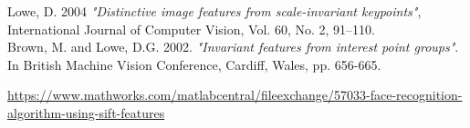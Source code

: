 \documentclass[conference]{IEEEtran}
\begin{document}
\medskip
\begin{thebibliography}{9}

{Lowe, D. 2004 \textit{"Distinctive image features from scale-invariant keypoints"}, International Journal of Computer Vision, Vol. 60, No. 2, 91–110.}\\

{Brown, M. and Lowe, D.G. 2002.  \textit{"Invariant features from interest point groups"}.  In British Machine Vision Conference, Cardiff, Wales, pp. 656-665.}


\medskip
{}
\url{https://www.mathworks.com/matlabcentral/fileexchange/57033-face-recognition-algorithm-using-sift-features}



\end{thebibliography}


\end{document}
